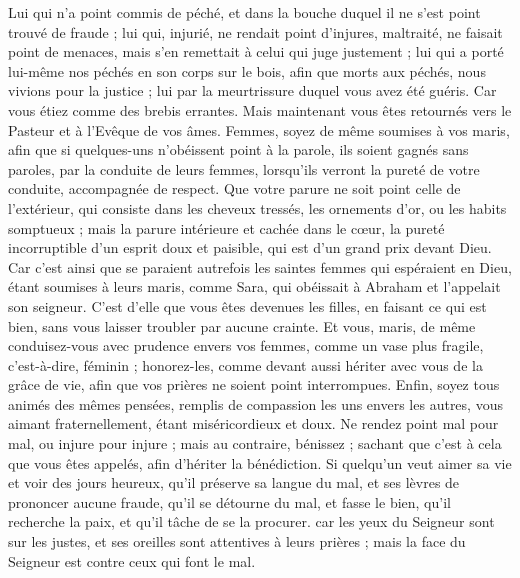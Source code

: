\begin{multicols}{2}
Lui qui n'a point commis de péché, et dans la bouche duquel il ne s’est point trouvé de fraude ;
lui qui, injurié, ne rendait point d’injures, maltraité, ne faisait point de menaces, mais s’en remettait à celui qui juge justement ;
lui qui a porté lui-même nos péchés en son corps sur le bois, afin que morts aux péchés, nous vivions pour la justice ; lui par la meurtrissure duquel vous avez été guéris.
Car vous étiez comme des brebis errantes. Mais maintenant vous êtes retournés vers le Pasteur et à l'Evêque de vos âmes.
\VerseOne{}Femmes, soyez de même soumises à vos maris, afin que si quelques-uns n'obéissent point à la parole, ils soient gagnés sans paroles, par la conduite de leurs femmes,
lorsqu'ils verront la pureté de votre conduite, accompagnée de respect.
Que votre parure ne soit point celle de l’extérieur, qui consiste dans les cheveux tressés, les ornements d’or, ou les habits somptueux ;
mais la parure intérieure et cachée dans le cœur, la pureté incorruptible d'un esprit doux et paisible, qui est d'un grand prix devant Dieu.
Car c'est ainsi que se paraient autrefois les saintes femmes qui espéraient en Dieu, étant soumises à leurs maris,
comme Sara, qui obéissait à Abraham et l’appelait son seigneur. C’est d’elle que vous êtes devenues les filles, en faisant ce qui est bien, sans vous laisser troubler par aucune crainte.
Et vous, maris, de même conduisez-vous avec prudence envers vos femmes, comme un vase plus fragile, c’est-à-dire, féminin ; honorez-les, comme devant aussi hériter avec vous de la grâce de vie, afin que vos prières ne soient point interrompues.
Enfin, soyez tous animés des mêmes pensées, remplis de compassion les uns envers les autres, vous aimant fraternellement, étant miséricordieux et doux.
Ne rendez point mal pour mal, ou injure pour injure ; mais au contraire, bénissez ; sachant que c’est à cela que vous êtes appelés, afin d’hériter la bénédiction.
Si quelqu’un veut aimer sa vie et voir des jours heureux, qu'il préserve sa langue du mal, et ses lèvres de prononcer aucune fraude,
qu'il se détourne du mal, et fasse le bien, qu'il recherche la paix, et qu'il tâche de se la procurer.
car les yeux du Seigneur sont sur les justes, et ses oreilles sont attentives à leurs prières ; mais la face du Seigneur est contre ceux qui font le mal.

\end{multicols}
